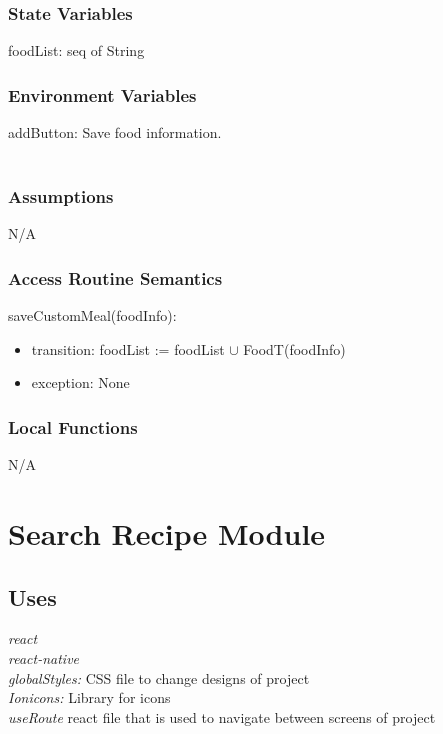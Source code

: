 \documentclass[12pt, titlepage]{article}
\begin{document}
\subsubsection{State Variables}
foodList: seq of String\\

\subsubsection{Environment Variables}

addButton: Save food information.\\\\

\subsubsection{Assumptions}

N/A

\subsubsection{Access Routine Semantics}

\noindent saveCustomMeal(foodInfo):
\begin{itemize}
\item transition: foodList := foodList $ \cup $ FoodT(foodInfo)
\item exception: None
\end{itemize}

\subsubsection{Local Functions}

N/A

\newpage

\section{Search Recipe Module} \label{Module} 

\subsection{Uses}
{\textit{react}}\\
{\textit{react-native}}\\
{\textit{globalStyles:} CSS file to change designs of project}\\
{\textit{Ionicons:} Library for icons}\\
{\textit{useRoute} react file that is used to navigate between screens of project}\\
\end{document}
